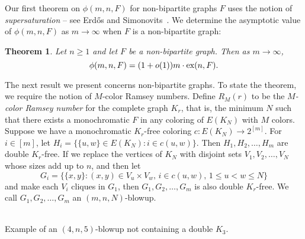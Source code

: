 \documentclass[12pt]{article}
\newtheorem{theorem}{Theorem}
\newcommand*{\ex}{\textnormal{ex}}
\begin{document}
Our first theorem on $\phi(m, n, F)$ for non-bipartite graphs $F$ uses the notion of \textit{supersaturation} -- see Erd\H{o}s and Simonovits~\cite{ErdosSimonovits1983}. We determine the asymptotic value of $\phi(m, n, F)$ as $m \rightarrow \infty$ when $F$ is a non-bipartite graph:

\begin{theorem}\label{thm:asymp}
  Let $n \geq 1$ and let $F$ be a non-bipartite graph. Then as $m \rightarrow \infty$, 
  \[
    \phi(m, n, F) = (1 + o(1))m \cdot \ex(n, F).
  \]
\end{theorem}

The next result we present concerns non-bipartite graphs. To state the theorem, we require the notion of $M$-color Ramsey numbers. Define $R_M(r)$ to be the \textit{$M$-color Ramsey number} for the complete graph $K_r$, that is, the minimum $N$ such that there exists a monochromatic $F$ in any coloring of $E(K_N)$ with $M$ colors. Suppose we have a monochromatic $K_r$-free coloring $c : E(K_N) \rightarrow 2^{[m]}$. For $i \in [m]$, let $H_i = \{\{u, w\} \in E(K_N) : i \in c(u, w)\}$. Then $H_1,H_2,\dots,H_m$ are double $K_r$-free. If we replace the vertices of $K_N$ with disjoint sets $V_1, V_2, \ldots, V_N$ whose sizes add up to $n$, and then let
\[ 
  G_i = \{\{x,y\} : (x,y) \in V_u \times V_w, \, i \in c(u, w), \, 1 \leq u < w \leq N\}
\] 
and make each $V_i$ cliques in $G_1$, then $G_1, G_2, \dots, G_m$ is also double $K_r$-free. We call $G_1, G_2, \dots, G_m$ an $(m, n, N)$-blowup. 

\begin{center}
  \\
  \small{Example of an $(4, n, 5)$-blowup not containing a double $K_3$.}
\end{center}
\end{document}

